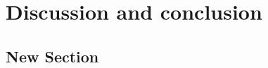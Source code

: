
\chapter[Discussion and conclusion]{Discussion and conclusion}
\label{chap5}

\section{New Section}

